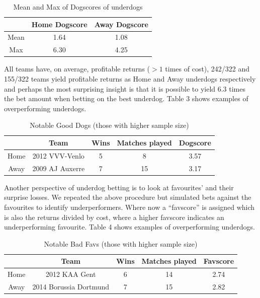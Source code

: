 \documentclass[12pt, a4paper]{article}
\begin{document}
\begin{table}[!ht]
    \centering
    \begin{tabular}{|c|c|c|}
    \hline & Home Dogscore & Away Dogscore \\
    \hline Mean & 1.64 & 1.08 \\
    \hline Max & 6.30 & 4.25 \\
    \hline

    \end{tabular}
    \caption{Mean and Max of Dogscores of underdogs}
    \label{tab:my_label}
\end{table}

All teams have, on average, profitable returns ($>1$ times of cost), 242/322 and 155/322 teams yield profitable returns as Home and Away underdogs respectively and perhaps the most surprising insight is that it is possible to yield 6.3 times the bet amount when betting on the best underdog. Table 3 shows examples of overperforming underdogs.

\begin{table}[!ht]
    \centering
    \begin{tabular}{|c|c|c|c|c|}
    \hline & Team & Wins & Matches played & Dogscore \\
    \hline Home & 2012 VVV-Venlo & 5 & 8 & 3.57 \\
    \hline Away & 2009 AJ Auxerre & 7 & 15 & 3.17 \\
    \hline

    \end{tabular}
    \caption{Notable Good Dogs (those with higher sample size)}
    \label{tab:my_label}
\end{table}

Another perspective of underdog betting is to look at favourites’ and their surprise losses. We repeated the above procedure but simulated bets against the favourites to identify underperformers. Where now a “favscore” is assigned which is also the returns divided by cost, where a higher favscore indicates an underperforming favourite. Table 4 shows examples of overperforming underdogs.

\begin{table}[!ht]
    \centering
    \begin{tabular}{|c|c|c|c|c|}
    \hline & Team & Wins & Matches played & Favscore \\
    \hline Home & 2012 KAA Gent & 6 & 14 & 2.74 \\
    \hline Away & 2014 Borussia Dortmund & 7 & 15 & 2.82 \\
    \hline

    \end{tabular}
    \caption{Notable Bad Favs (those with higher sample size)}
    \label{tab:my_label}
\end{table}
\end{document}
